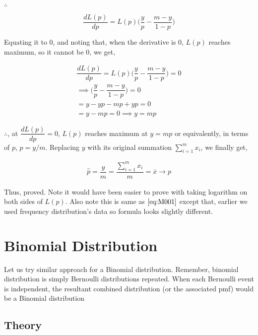 \documentclass[float=false,crop=false]{standalone}
\begin{document}
\(\therefore\)

\[
\dfrac{dL(p)}{dp} = L(p)\Big(\dfrac{y}{p} - \dfrac{m-y}{1-p}\Big)
\]

Equating it to 0, and noting that, when the derivative is 0, \(L(p)\)
reaches maximum, so it cannot be 0, we get,

\[
\begin{aligned}
    \dfrac{dL(p)}{dp} = L(p)\Big(\dfrac{y}{p} - \dfrac{m-y}{1-p}\Big) = 0 \\
    \implies \Big(\dfrac{y}{p} - \dfrac{m-y}{1-p}\Big)  = 0 \\
    = y - yp - mp + yp = 0 \\
    = y - mp = 0
    \implies y = mp
\end{aligned}
\]

    \(\therefore\), at \(\dfrac{dL(p)}{dp} = 0\), \(L(p)\) reaches maximum
at \(y = mp\) or equivalently, in terms of \(p\), \(p = y/m\). Replacing
\(y\) with its original summation \(\sum\limits_{i=1}^{m}x_i\), we
finally get,
\begin{tcolorbox}[colback=green!5,colframe=green!40!black,title=Bernoulli Distribution; $m$ trials]
\begin{equation}
    \begin{aligned}
        \hat{p} = \dfrac{y}{m} = \dfrac{\sum\limits_{i=1}^{m}x_i}{m} = \overline{x} \to p \label{eq:M003}
    \end{aligned}
\end{equation}
\end{tcolorbox}
    Thus, proved. Note it would have been easier to prove with taking
logarithm on both sides of \(L(p)\). Also note this is same as
\(\ref{eq:M001}\) except that, earlier we used frequency distribution's
data so formula looks slightly different.

    \section{Binomial Distribution}\label{binomial-distribution}

Let us try similar approach for a Binomial distribution. Remember,
binomial distribution is simply Bernoulli distributions repeated. When
each Bernoulli event is independent, the resultant combined distribution
(or the associated pmf) would be a Binomial distribution

\subsection{Theory}\label{theory}
\end{document}
